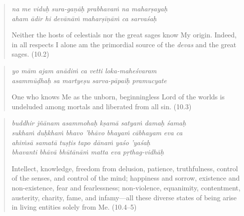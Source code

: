 \documentclass[12pt, twoside, openright]{memoir}
\begin{document}
\par
\begin{verse}
\textit{na me viduḥ sura-gaṇāḥ prabhavaṁ na maharṣayaḥ} \\
\textit{aham ādir hi devānāṁ maharṣīṇāṁ ca sarvaśaḥ}

\noindent Neither the hosts of celestials nor the great sages know My origin. Indeed, in all respects I alone am the primordial source of the \textit{devas} and the great sages. (10.2)
\end{verse}
\par



\par
\begin{verse}
\textit{yo mām ajam anādiṁ ca vetti loka-maheśvaram} \\
\textit{asammūḍhaḥ sa martyeṣu sarva-pāpaiḥ pramucyate}

\noindent One who knows Me as the unborn, beginningless Lord of the worlds is undeluded among mortals and liberated from all sin. (10.3)
\end{verse}
\par



\par
\begin{verse}
\textit{buddhir jñānam asammohaḥ kṣamā satyaṁ damaḥ śamaḥ} \\
\textit{sukhaṁ duḥkhaṁ bhavo ’bhāvo bhayaṁ cābhayam eva ca} \\
\textit{ahiṁsā samatā tuṣṭis tapo dānaṁ yaśo ’yaśaḥ} \\
\textit{bhavanti bhāvā bhūtānāṁ matta eva pṛthag-vidhāḥ}

\noindent Intellect, knowledge, freedom from delusion, patience, truthfulness, control of the senses, and control of the mind; happiness and sorrow, existence and non-existence, fear and fearlessness; non-violence, equanimity, contentment, austerity, charity, fame, and infamy---all these diverse states of being arise in living entities solely from Me. (10.4–5)
\end{verse}
\par
\end{document}
